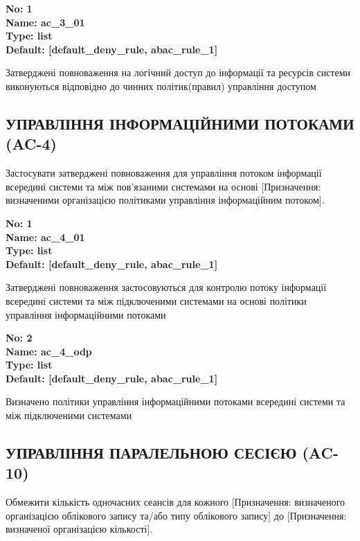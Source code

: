 \documentclass{article}
\begin{document}
\vspace{10pt}
{\footnotesize\bfseries
No: 1\\
Name: ac\_\allowbreak{}3\_\allowbreak{}01\\
Type: list\\
Default: [\textquotedbl{}default\_\allowbreak{}deny\_\allowbreak{}rule\textquotedbl{}, \textquotedbl{}abac\_\allowbreak{}rule\_\allowbreak{}1\textquotedbl{}]
}

{\footnotesize Затверджені повноваження на логічний доступ до інформації та ресурсів системи виконуються відповідно до чинних політик(правил) управління доступом}




\subsection{УПРАВЛІННЯ ІНФОРМАЦІЙНИМИ ПОТОКАМИ (AC-4)}
Застосувати затверджені повноваження для управління потоком інформації всередині системи та між пов'язаними системами на основі [Призначення: визначеними організацією політиками управління інформаційним потоком].

\vspace{10pt}
{\footnotesize\bfseries
No: 1\\
Name: ac\_\allowbreak{}4\_\allowbreak{}01\\
Type: list\\
Default: [\textquotedbl{}default\_\allowbreak{}deny\_\allowbreak{}rule\textquotedbl{}, \textquotedbl{}abac\_\allowbreak{}rule\_\allowbreak{}1\textquotedbl{}]
}

{\footnotesize Затверджені повноваження застосовуються для контролю потоку інформації всередині системи та між підключеними системами на основі політики управління інформаційними потоками}


{\footnotesize\bfseries
No: 2\\
Name: ac\_\allowbreak{}4\_\allowbreak{}odp\\
Type: list\\
Default: [\textquotedbl{}default\_\allowbreak{}deny\_\allowbreak{}rule\textquotedbl{}, \textquotedbl{}abac\_\allowbreak{}rule\_\allowbreak{}1\textquotedbl{}]
}

{\footnotesize Визначено політики управління інформаційними потоками всередині системи та між підключеними системами}




\subsection{УПРАВЛІННЯ ПАРАЛЕЛЬНОЮ СЕСІЄЮ (AC-10)}
Обмежити кількість одночасних сеансів для кожного [Призначення: визначеного організацією облікового запису та/або типу облікового запису] до [Призначення: визначеної організацією кількості].
\end{document}
